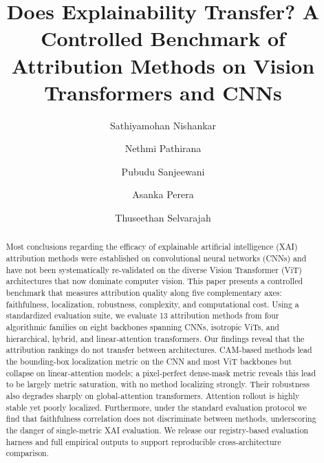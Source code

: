 \documentclass[final,5p,times,twocolumn]{elsarticle}
\begin{document}
\begin{frontmatter}

\title{Does Explainability Transfer? A Controlled Benchmark of Attribution Methods on Vision Transformers and CNNs}

\author[aff1]{Sathiyamohan Nishankar}
\author[aff2]{Nethmi Pathirana}
\author[aff3]{Pubudu Sanjeewani}
\author[aff4]{Asanka Perera}
\author[aff5]{Thuseethan Selvarajah}



\begin{abstract}
Most conclusions regarding the efficacy of explainable artificial intelligence (XAI) attribution methods were established on convolutional neural networks (CNNs) and have not been systematically re-validated on the diverse Vision Transformer (ViT) architectures that now dominate computer vision. This paper presents a controlled benchmark that measures attribution quality along five complementary axes: faithfulness, localization, robustness, complexity, and computational cost. Using a standardized evaluation suite, we evaluate 13 attribution methods from four algorithmic families on eight backbones spanning CNNs, isotropic ViTs, and hierarchical, hybrid, and linear-attention transformers. Our findings reveal that the attribution rankings do not transfer between architectures. CAM-based methods lead the bounding-box localization metric on the CNN and most ViT backbones but collapse on linear-attention models; a pixel-perfect dense-mask metric reveals this lead to be largely metric saturation, with no method localizing strongly. Their robustness also degrades sharply on global-attention transformers. Attention rollout is highly stable yet poorly localized. Furthermore, under the standard evaluation protocol we find that faithfulness correlation does not discriminate between methods, underscoring the danger of single-metric XAI evaluation. We release our registry-based evaluation harness and full empirical outputs to support reproducible cross-architecture comparison.
\end{abstract}


\end{frontmatter}
\end{document}
